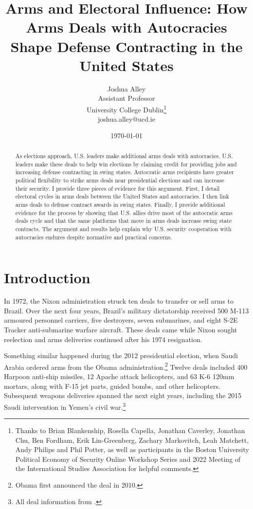 \documentclass[12pt]{article}
\title{\textbf{Arms and Electoral Influence: How Arms Deals with Autocracies Shape Defense Contracting in the United States}}
\author{Joshua Alley \\
Assistant Professor \\
University College Dublin\thanks{Thanks to Brian Blankenship, Rosella Capella, Jonathan Caverley, Jonathan Chu, Ben Fordham, Erik Lin-Greenberg, Zachary Markovitch, Leah Matchett, Andy Philips and Phil Potter, as well as participants in the Boston University Political Economy of Security Online Workshop Series and 2022 Meeting of the International Studies Association for helpful comments.} \\
joshua.alley@ucd.ie
}
\date{\today}
\begin{document}
\maketitle 

\begin{abstract} 
As elections approach, U.S. leaders make additional arms deals with autocracies. 
U.S. leaders make these deals to help win elections by claiming credit for providing jobs and increasing defense contracting in swing states.
Autocratic arms recipients have greater political flexibility to strike arms deals near presidential elections and can increase their security. 
I provide three pieces of evidence for this argument.  
First, I detail electoral cycles in arms deals between the United States and autocracies. 
I then link arms deals to defense contract awards in swing states.
Finally, I provide additional evidence for the process by showing that U.S. allies drive most of the autocratic arms deals cycle and that the same platforms that move in arms deals increase swing state contracts.  
The argument and results help explain why U.S. security cooperation with autocracies endures despite normative and practical concerns.
\end{abstract} 



\newpage 
\doublespace 


\section{Introduction}



In 1972, the Nixon administration struck ten deals to transfer or sell arms to Brazil.
Over the next four years, Brazil's military dictatorship received 500 M-113 armoured personnel carriers, five destroyers, seven submarines, and eight S-2E Tracker anti-submarine warfare aircraft.
These deals came while Nixon sought reelection and arms deliveries continued after his 1974 resignation. 


Something similar happened during the 2012 presidential election, when Saudi Arabia ordered arms from the Obama administration.\footnote{Obama first announced the deal in 2010.} 
Twelve deals included 400 Harpoon anti-ship missiles, 12 Apache attack helicopters, and 63 K-6 120mm mortars, along with F-15 jet parts, guided bombs, and other helicopters. 
Subsequent weapons deliveries spanned the next eight years, including the 2015 Saudi intervention in Yemen's civil war.\footnote{All deal information from \citep{SIPRI2021}.}
\end{document}
